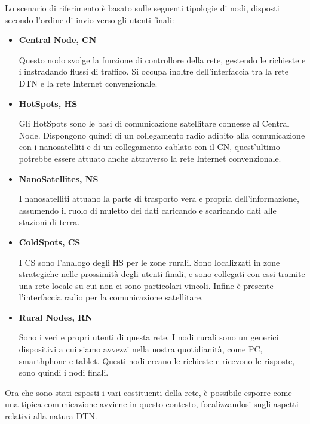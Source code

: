 \documentclass[a4paper]{article}
\begin{document}
		Lo scenario di riferimento è basato sulle seguenti tipologie di nodi, disposti secondo l'ordine di invio verso gli utenti finali:
		\begin{itemize}
			\item {\bf Central Node, CN}
			
			Questo nodo svolge la funzione di controllore della rete, gestendo le richieste e i instradando flussi di traffico. Si occupa inoltre dell'interfaccia tra la rete DTN e la rete Internet convenzionale.
			
			\item {\bf HotSpots, HS}
			
			Gli HotSpots sono le basi di comunicazione satellitare connesse al Central Node. Dispongono quindi di un collegamento radio adibito alla comunicazione con i nanosatelliti e di un collegamento cablato con il CN, quest'ultimo potrebbe essere attuato anche attraverso la rete Internet convenzionale. 
			
			\item {\bf NanoSatellites, NS}
			
			I nanosatelliti attuano la parte di trasporto vera e propria dell'informazione, assumendo il ruolo di muletto dei dati caricando e scaricando dati alle stazioni di terra.
			
			\item {\bf ColdSpots, CS}
			
			I CS sono l'analogo degli HS per le zone rurali. Sono localizzati in zone strategiche nelle prossimità degli utenti finali, e sono collegati con essi tramite una rete locale su cui non ci sono particolari vincoli. Infine è presente l'interfaccia radio per la comunicazione satellitare.
			
			\item {\bf Rural Nodes, RN}
			
			Sono i veri e propri utenti di questa rete. I nodi rurali sono un generici dispositivi a cui siamo avvezzi nella nostra quotidianità, come PC, smarthphone e tablet. Questi nodi creano le richieste e ricevono le risposte, sono quindi i nodi finali.  
						
		\end{itemize}
		
		Ora che sono stati esposti i vari costituenti della rete, è possibile esporre come una tipica comunicazione avviene in questo contesto, focalizzandosi sugli aspetti relativi alla natura DTN. 
		
\end{document}
